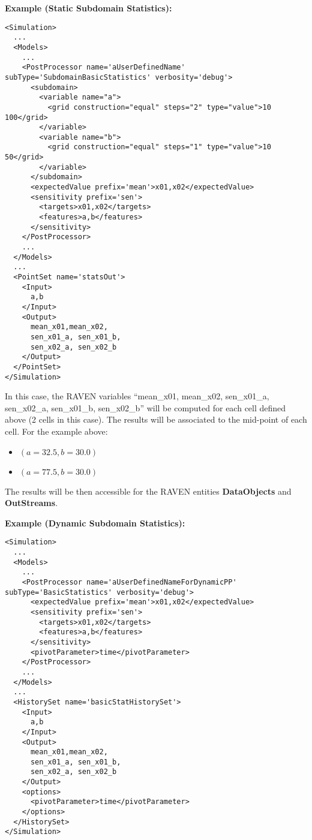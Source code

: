 \textbf{Example (Static Subdomain Statistics):}
\begin{lstlisting}[style=XML,morekeywords={name,subType,debug}]
<Simulation>
  ...
  <Models>
    ...
    <PostProcessor name='aUserDefinedName' subType='SubdomainBasicStatistics' verbosity='debug'>
      <subdomain>
        <variable name="a">
          <grid construction="equal" steps="2" type="value">10 100</grid>
        </variable>
        <variable name="b">
          <grid construction="equal" steps="1" type="value">10 50</grid>
        </variable>
      </subdomain>
      <expectedValue prefix='mean'>x01,x02</expectedValue>
      <sensitivity prefix='sen'>
        <targets>x01,x02</targets>
        <features>a,b</features>
      </sensitivity>
    </PostProcessor>
    ...
  </Models>
  ...
  <PointSet name='statsOut'>
    <Input>
      a,b
    </Input>
    <Output>
      mean_x01,mean_x02,
      sen_x01_a, sen_x01_b,
      sen_x02_a, sen_x02_b
    </Output>
  </PointSet>
</Simulation>
\end{lstlisting}

In this case, the RAVEN variables ``mean\_x01, mean\_x02, sen\_x01\_a, sen\_x02\_a, sen\_x01\_b, sen\_x02\_b''
will be computed for each cell defined above (2 cells in this case).
The results will be associated to the mid-point of each cell. For the example above:
\begin{itemize}
 \item $(a=32.5,b=30.0)$
 \item $(a=77.5,b=30.0)$
\end{itemize}
The results will be then accessible for the RAVEN entities \textbf{DataObjects} and \textbf{OutStreams}.

\textbf{Example (Dynamic Subdomain Statistics):}

\begin{lstlisting}[style=XML,morekeywords={name,subType,debug}]
<Simulation>
  ...
  <Models>
    ...
    <PostProcessor name='aUserDefinedNameForDynamicPP' subType='BasicStatistics' verbosity='debug'>
      <expectedValue prefix='mean'>x01,x02</expectedValue>
      <sensitivity prefix='sen'>
        <targets>x01,x02</targets>
        <features>a,b</features>
      </sensitivity>
      <pivotParameter>time</pivotParameter>
    </PostProcessor>
    ...
  </Models>
  ...
  <HistorySet name='basicStatHistorySet'>
    <Input>
      a,b
    </Input>
    <Output>
      mean_x01,mean_x02,
      sen_x01_a, sen_x01_b,
      sen_x02_a, sen_x02_b
    </Output>
    <options>
      <pivotParameter>time</pivotParameter>
    </options>
  </HistorySet>
</Simulation>
\end{lstlisting}

